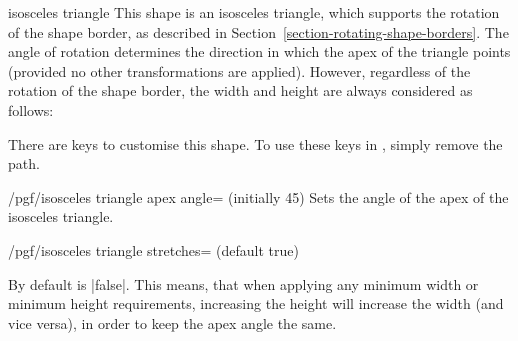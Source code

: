 \begin{shape}{isosceles triangle}
  This shape is an isosceles triangle, which supports the rotation of 
  the shape border, as described in 
  Section~\ref{section-rotating-shape-borders}. The angle of rotation
  determines the direction in which the apex of the triangle points
  (provided no other transformations are applied). However, regardless
  of the rotation of the shape border, the width and height are 
  always considered as follows:
	
\begin{codeexample}[]
\end{codeexample}

	There are \pgfname{} keys to customise this shape. 
	To use these keys in \tikzname, simply remove the  
	path.
    
  \begin{key}{/pgf/isosceles triangle apex angle= (initially 45)}
    Sets the angle of the apex of the isosceles triangle. 
  \end{key}

\begin{key}{/pgf/isosceles triangle stretches= (default true)}
  
	By default  is |false|. This means, that when applying
	any minimum width or minimum height requirements, increasing the 
	height will increase the width (and	vice versa), in order to keep the
	apex angle the same.
   
\begin{codeexample}[]
\end{codeexample}	


\end{key}
\end{shape}
